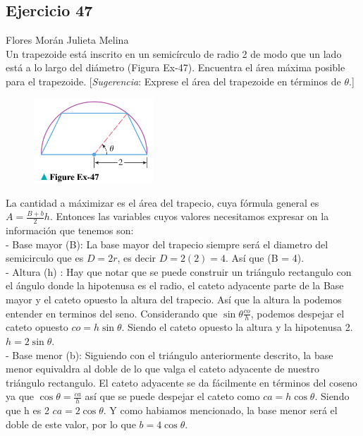 \documentclass[12pt]{article}
\begin{document}
\subsection{Ejercicio 47} Flores Morán Julieta Melina \\

Un trapezoide está inscrito en un semicírculo de radio 2 de modo que un lado está a lo largo del diámetro (Figura Ex-47). Encuentra el área máxima posible para el trapezoide. [\textit{Sugerencia}: Exprese el área del trapezoide en términos de $\theta$.]\\
\begin{figure}[H]
\centering
\includegraphics[width=0.4\textwidth]{../img/img_Lista3/3_47.png}
\end{figure}
La cantidad a máximizar es el área del trapecio, cuya fórmula general es $A= \frac{B+b}{2}h$. Entonces las variables cuyos valores necesitamos expresar on la información que tenemos son:\\
- Base mayor (B): La base mayor del trapecio siempre será el diametro del semicirculo que es $D=2r$, es decir $D=2(2) = 4$. Así  que (B = 4).\\
- Altura (h) : Hay que notar que se puede construir un triángulo rectangulo con el ángulo donde la hipotenusa es el radio, el cateto adyacente parte de la Base mayor y el cateto opuesto la altura del trapecio. Así que la altura la podemos entender en terminos del seno. Considerando que $\sin{\theta}\frac{co}{h}$, podemos despejar el cateto opuesto $co = h\sin{\theta}$. Siendo el cateto opuesto la altura y la hipotenusa 2. $h = 2\sin{\theta}$.\\
- Base menor (b): Siguiendo con el triángulo anteriormente descrito, la base menor equivaldra al doble de lo que valga el cateto adyacente de nuestro triángulo rectangulo. El cateto adyacente se da fácilmente en términos del coseno ya que $\cos{\theta} = \frac{ca}{h}$ así que se puede despejar el cateto como $ca = h\cos{\theta}$. Siendo que h es 2 $ca = 2\cos{\theta}$. Y como habiamos mencionado, la base menor será el doble de este valor, por lo que $b = 4\cos{\theta}$.\\
\end{document}
